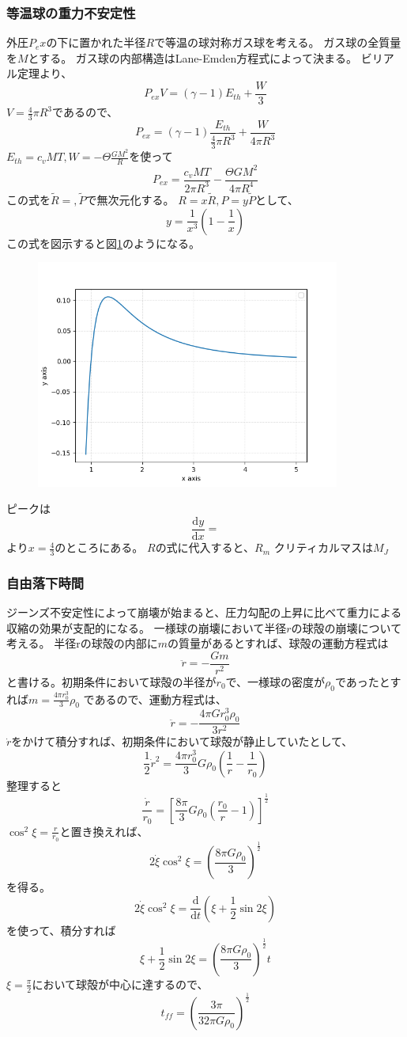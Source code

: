 \documentclass{jsarticle}
\newcommand{\dder}[2][]{\frac{\mathrm{d}#1}{\mathrm{d}#2}}
\newcommand{\half}{\frac{1}{2}}
\newcommand{\ethe}{E_{th}}
\newcommand{\beq}{\begin{equation}}
\newcommand{\eeq}{\end{equation}}
\begin{document}
\subsubsection{等温球の重力不安定性}
外圧$P_ex$の下に置かれた半径$R$で等温の球対称ガス球を考える。
ガス球の全質量を$M$とする。
ガス球の内部構造はLane-Emden方程式によって決まる。
ビリアル定理より、
\beq
P_{ex} V = (\gamma -1)\ethe + \frac{W}{3}
\eeq
$V = \frac{4}{3} \pi R^3$であるので、
\beq
P_{ex} = (\gamma -1)\frac{\ethe }{\frac{4}{3} \pi R^3}+ \frac{W}{4 \pi R^3}
\eeq
$\ethe = c_v MT , W = - \Theta \frac{GM^2}{R}$を使って
\beq
P_{ex} = \frac{c_v MT}{2\pi R^3} - \frac{\Theta GM^2}{4\pi R^4}
\eeq
この式を$\tilde{R} = , \tilde{P}$で無次元化する。
$R = x \tilde{R}, P = y \tilde{P}$として、
\beq
    y = \frac{1}{x^3} \left(1 - \frac{1}{x}\right)
\eeq
この式を図示すると図\ref{fig:spherical}のようになる。
\begin{figure}[H]
    \includegraphics[clip,width=10.0cm]{graph/spherical.png}
    \caption{}
    \label{fig:spherical}
\end{figure}
ピークは
\beq
\dder[y]{x} = 
\eeq
より$x = \frac{4}{3}$のところにある。
$R$の式に代入すると、$R_m$
クリティカルマスは$M_J$

\subsubsection{自由落下時間}
ジーンズ不安定性によって崩壊が始まると、圧力勾配の上昇に比べて重力による収縮の効果が支配的になる。
一様球の崩壊において半径$r$の球殻の崩壊について考える。
半径rの球殻の内部に$m$の質量があるとすれば、球殻の運動方程式は
\beq
    \ddot{r} = - \frac{Gm}{r^2}
\eeq
と書ける。初期条件において球殻の半径が$r_0$で、一様球の密度が$\rho_0$であったとすれば$m = \frac{4\pi r_0^3}{3}\rho_0$
であるので、運動方程式は、
\beq
\ddot{r} = - \frac{4\pi Gr_0^3 \rho_0}{3r^2}
\eeq
$\dot{r}$をかけて積分すれば、初期条件において球殻が静止していたとして、
\beq
\half \dot{r}^2 = \frac{4 \pi r_0^3}{3}G\rho_0\left(\frac{1}{r} - \frac{1}{r_0} \right)
\eeq
整理すると
\beq
\frac{\dot{r}}{r_0} = \left[ \frac{8 \pi }{3}G\rho_0\left(\frac{r_0}{r} - 1\right) \right]^\half
\eeq
$\cos^2\xi = \frac{r}{r_0}$と置き換えれば、
\beq
2\dot{\xi}\cos^2\xi = \left(\frac{8\pi G \rho_0}{3} \right)^\half
\eeq
を得る。
\beq
2\dot{\xi}\cos^2\xi = \dder[]{t} \left(\xi + \half\sin 2\xi \right)
\eeq
を使って、積分すれば
\beq
\xi + \half \sin 2\xi = \left(\frac{8\pi G \rho_0}{3} \right)^\half t
\eeq
$\xi = \frac{\pi}{2}$において球殻が中心に達するので、
\beq
t_{ff} = \left(\frac{3\pi}{32\pi G \rho_0} \right)^\half
\eeq
\end{document}
